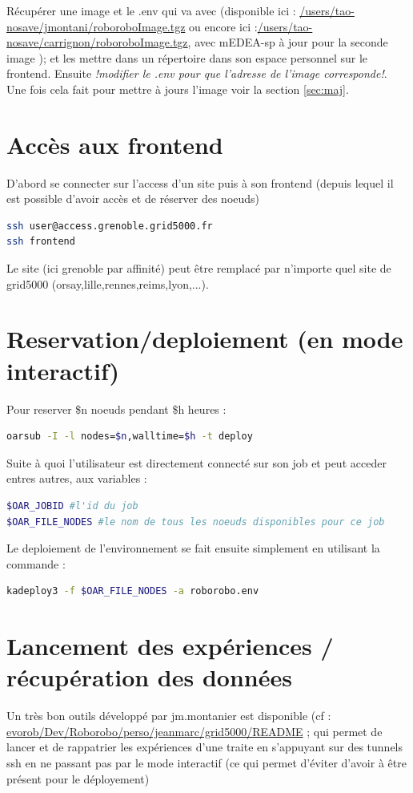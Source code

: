 \documentclass[a4paper,10pt]{report}
\begin{document}
Récupérer une image et le .env qui va avec (disponible ici : \url{/users/tao-nosave/jmontani/roboroboImage.tgz} ou encore ici :\url{/users/tao-nosave/carrignon/roboroboImage.tgz}, avec mEDEA-sp à jour pour la seconde image ); et les mettre dans un répertoire dans son espace personnel sur le frontend. Ensuite \emph{!modifier le .env pour que l'adresse de l'image corresponde!}.
Une fois cela fait pour mettre à jours l'image voir la section \ref{sec:maj}.

\section{Accès aux frontend}
\label{sec:frontend}
D'abord se connecter sur l'access d'un site puis à son frontend (depuis lequel il est possible d'avoir accès et de réserver des noeuds)
\begin{lstlisting}[language=bash]
ssh user@access.grenoble.grid5000.fr
ssh frontend
\end{lstlisting}
Le site (ici grenoble par affinité) peut être remplacé par n'importe quel site de grid5000 (orsay,lille,rennes,reims,lyon,...).



\section{Reservation/deploiement (en mode interactif)}
\label{sec:reserv}
Pour reserver \$n noeuds pendant \$h heures :

\begin{lstlisting}[language=bash]
oarsub -I -l nodes=$n,walltime=$h -t deploy
\end{lstlisting}


Suite à quoi l'utilisateur est directement connecté sur son job et peut acceder entres autres, aux variables :

\begin{lstlisting}[language=bash]
$OAR_JOBID #l'id du job
$OAR_FILE_NODES #le nom de tous les noeuds disponibles pour ce job
\end{lstlisting}
Le deploiement de l'environnement se fait ensuite simplement en utilisant la commande :
\begin{lstlisting}[language=bash]
kadeploy3 -f $OAR_FILE_NODES -a roborobo.env

\end{lstlisting}

\section{Lancement des expériences / récupération des données}
\label{sec:run}
Un très bon outils développé par jm.montanier est disponible (cf : \url{evorob/Dev/Roborobo/perso/jeanmarc/grid5000/README} ; qui permet de lancer et de rappatrier les expériences d'une traite en s'appuyant sur des tunnels ssh en ne passant pas par le mode interactif (ce qui permet d'éviter d'avoir à être présent pour le déployement)
\end{document}
